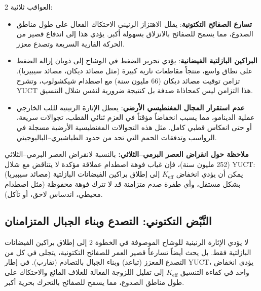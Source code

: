 \documentclass[11pt,a4paper]{article}
\begin{document}
\begin{multicols}{2}
		العواقب ثلاثية:
		\begin{itemize}
			\item \textbf{تسارع الصفائح التكتونية}: يقلل الاهتزاز الرنيني الاحتكاك الفعال على طول مناطق الصدوع، مما يسمح للصفائح بالانزلاق بسهولة أكبر. يؤدي هذا إلى اندفاع قصير من الحركة القارية السريعة وتصدع معزز.
			\item \textbf{البراكين البازلتية الفيضانية}: يؤدي تحرير الضغط في الوشاح إلى ذوبان إزالة الضغط على نطاق واسع، منتجاً مقاطعات نارية كبيرة (مثل مصائد ديكان، مصائد سيبيريا). تزامن توقيت مصائد ديكان (66 مليون سنة) مع اصطدام شيكشولوب، وتشرح YUCT هذا التزامن ليس كمحاذاة صدفة بل كنتيجة ضرورية لنفس شلال التنسيق.
			\item \textbf{عدم استقرار المجال المغنطيسي الأرضي}: يعطل الإثارة الرنينية لللب الخارجي عملية الدينامو، مما يسبب انخفاضاً مؤقتاً في العزم ثنائي القطب، تجوالات سريعة، أو حتى انعكاس قطبي كامل. مثل هذه التجوالات المغنطيسية الأرضية مسجلة في الرواسب وتدفقات الحمم التي تحد من حدود الطباشيري–الباليوجيني.
		\end{itemize}
		
		\noindent
		\textbf{ملاحظة حول انقراض العصر البرمي–الثلاثي:} بالنسبة لانقراض العصر البرمي–الثلاثي (252 مليون سنة)، فإن غياب فوهة اصطدام عملاقة مؤكدة لا يتناقض مع شلال YUCT: يمكن أن يؤدي انخفاض \(K_{\mathrm{eff}}\) إلى إطلاق براكين الفيضانات البازلتية (مصائد سيبيريا) بشكل مستقل، وأي طفرة صدم متزامنة قد لا تترك فوهة محفوظة (مثل اصطدام محيطي، اندساس لاحق، أو تآكل).
		
		\subsection{النَّبْض التكتوني: التصدع وبناء الجبال المتزامنان}
		لا يؤدي الإثارة الرنينية للوشاح الموصوفة في الخطوة 2 إلى إطلاق براكين الفيضانات البازلتية فقط. بل يحث أيضاً تسارعاً قصير العمر للصفائح التكتونية، يتجلى في كل من التصدع المعزز (تباعد) وبناء الجبال بالتصادم (تقارب). في إطار YUCT، يؤدي انخفاض واحد في كفاءة التنسيق \(K_{\mathrm{eff}}\) إلى تقليل اللزوجة الفعالة للغلاف المائع والاحتكاك على طول مناطق الصدوع، مما يسمح للصفائح بالتحرك بحرية أكبر.
		

\end{multicols}
\end{document}
